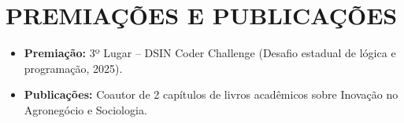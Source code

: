 \documentclass[11pt,a4paper]{article}
\begin{document}
\vspace{0.2cm}
\section*{PREMIAÇÕES E PUBLICAÇÕES}
\begin{itemize}
    \item \textbf{Premiação:} 3º Lugar -- DSIN Coder Challenge (Desafio estadual de lógica e programação, 2025).
    \item \textbf{Publicações:} Coautor de 2 capítulos de livros acadêmicos sobre Inovação no Agronegócio e Sociologia.
\end{itemize}
\end{document}
